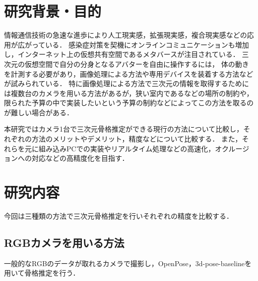 \documentclass[titlepage]{jarticle}
\begin{document}
\maketitle

%
%
\section{研究背景・目的}
%
情報通信技術の急速な進歩により人工現実感，拡張現実感，複合現実感などの応用が広がっている．
感染症対策を契機にオンラインコミュニケーションも増加し，インターネット上の仮想共有空間であるメタバースが注目されている．
三次元の仮想空間で自分の分身となるアバターを自由に操作するには，
体の動きを計測する必要があり，画像処理による方法や専用デバイスを装着する方法などが試みられている．
特に画像処理による方法で三次元の情報を取得するためには複数台のカメラを用いる方法があるが，狭い室内であるなどの場所の制約や，
限られた予算の中で実装したいという予算の制約などによってこの方法を取るのが難しい場合がある．

本研究ではカメラ1台で三次元骨格推定ができる現行の方法について比較し，それぞれの方法のメリットやデメリット，精度などについて比較する．
また，それらを元に組み込みPCでの実装やリアルタイム処理などの高速化，オクルージョンへの対応などの高精度化を目指す．
%
%
\section{研究内容}
%
今回は三種類の方法で三次元骨格推定を行いそれぞれの精度を比較する．
%
%
\subsection{RGBカメラを用いる方法}
%
一般的なRGBのデータが取れるカメラで撮影し，OpenPose，3d-pose-baselineを用いて骨格推定を行う．
%
%
\end{document}
